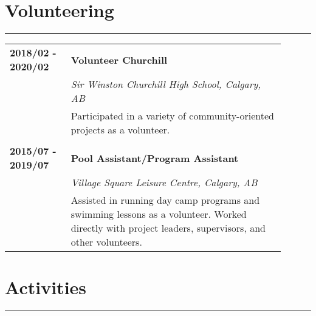 \documentclass[letterpaper]{article}
\newcommand{\horizontalLine}{%
    \rule{\linewidth}{0.2pt}
    \vspace{1ex}
}
\begin{document}
    \section*{Volunteering}

        \horizontalLine

        \begin{tabular}{p{0.2\linewidth} p{0.7\linewidth}} 
            \textbf{2018/02 - 2020/02} & \large\textbf{Volunteer Churchill} \\
            & \emph{Sir Winston Churchill High School, Calgary, AB} \\
            & Participated in a variety of community-oriented projects as a volunteer. \\
            \\
            \textbf{2015/07 - 2019/07} & \large\textbf{Pool Assistant/Program Assistant} \\
            & \emph{Village Square Leisure Centre, Calgary, AB} \\
            & Assisted in running day camp programs and swimming lessons as a volunteer.
            Worked directly with project leaders, supervisors, and other volunteers. \\
        \end{tabular}

    \section*{Activities}

        \horizontalLine
\end{document}
